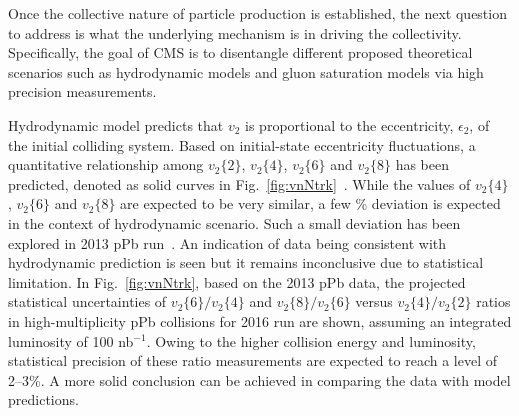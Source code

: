 Once the collective nature of particle production is established, 
the next question to address is what the underlying mechanism is in 
driving the collectivity. Specifically, the goal of CMS is to 
disentangle different proposed theoretical scenarios such as hydrodynamic models and
gluon saturation models via high precision measurements. 

Hydrodynamic model predicts that $v_2$ is proportional to the 
eccentricity, $\epsilon_{2}$, of the initial colliding system.
Based on initial-state eccentricity fluctuations, a quantitative
relationship among $v_2\{2\}$, $v_2\{4\}$, $v_2\{6\}$ and $v_2\{8\}$ 
has been predicted, denoted as solid curves in Fig.~\ref{fig:vnNtrk}~\cite{Yan:2013laa}. 
While the values of $v_2\{4\}$, $v_2\{6\}$ and $v_2\{8\}$
are expected to be very similar, a few \% deviation is expected in the context of
hydrodynamic scenario. Such a small deviation has been explored in 2013 
pPb run~\cite{Khachatryan:2015waa}. An indication of data being consistent 
with hydrodynamic prediction is seen but it remains inconclusive due to 
statistical limitation. In Fig.~\ref{fig:vnNtrk}, based on the 2013 pPb data, the projected statistical
uncertainties of $v_2\{6\}/v_2\{4\}$ and $v_2\{8\}/v_2\{6\}$ versus
$v_2\{4\}/v_2\{2\}$ ratios in high-multiplicity pPb collisions for 2016 run
are shown, assuming an integrated luminosity of 100 nb$^{-1}$.
Owing to the higher collision energy and luminosity, statistical precision 
of these ratio measurements are expected to reach a level of 2--3\%.
A more solid conclusion can be achieved in comparing the data with model predictions.